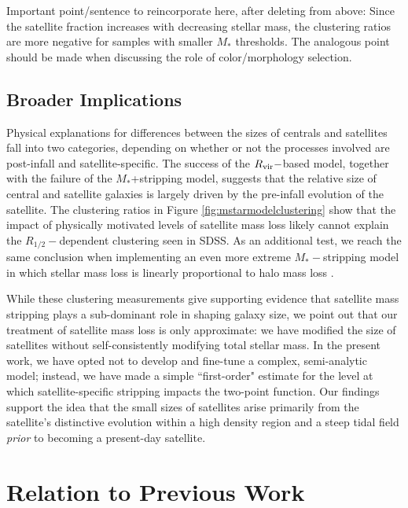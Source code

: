 \documentclass[usenatbib,usegraphicx,letterpaper]{mn2e}
\newcommand{\rhalf}{R_{1/2}}
\newcommand{\mstar}{M_{\ast}}
\newcommand{\rvir}{R_{\rm vir}}
\begin{document}
{\color{blue} Important point/sentence to reincorporate here, after deleting from above:} Since the satellite fraction increases with decreasing stellar mass, the clustering ratios are more negative for samples with smaller $\mstar$ thresholds. {\color{blue} The analogous point should be made when discussing the role of color/morphology selection}.

\subsection{Broader Implications}
\label{subsec:broader_implications}

Physical explanations for differences between the sizes of centrals and satellites fall into two categories, depending on whether or not the processes involved are post-infall and satellite-specific. The success of the $\rvir-$based model, together with the failure of the $\mstar$+stripping model, suggests that the relative size of central and satellite galaxies is largely driven by the {\rm pre-infall} evolution of the satellite. The clustering ratios in Figure \ref{fig:mstarmodelclustering} show that the impact of physically motivated levels of satellite mass loss likely cannot explain the $\rhalf-$dependent clustering seen in SDSS. As an additional test, we reach the same conclusion when implementing an even more extreme $\mstar-$stripping model in which stellar mass loss is linearly proportional to halo mass loss \citep[][Model 1]{watson_etal12}.

While these clustering measurements give supporting evidence that satellite mass stripping plays a sub-dominant role in shaping galaxy size, we point out that our treatment of satellite mass loss is only approximate: we have modified the size of satellites without self-consistently modifying total stellar mass. In the present work, we have opted not to develop and fine-tune a complex, semi-analytic model; instead, we have made a simple ``first-order" estimate for the level at which satellite-specific stripping impacts the two-point function. Our findings support the idea that the small sizes of satellites arise primarily from the satellite's distinctive evolution within a high density region and a steep tidal field {\em prior} to becoming a present-day satellite.

\section{Relation to Previous Work}
\label{subsec:previous_work}
\end{document}
